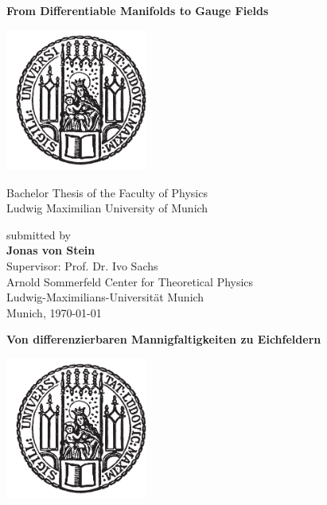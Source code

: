 \documentclass[a4paper,11pt,twoside,openright]{report}
\newcommand{\thesistitleEng}{From Differentiable Manifolds to Gauge Fields}
\newcommand{\thesistitleDe}{Von differenzierbaren Mannigfaltigkeiten zu Eichfeldern}
\newcommand{\authorname}{Jonas von Stein}
\newcommand{\thesisdate}{\today}
\begin{document}
\begin{titlepage}
  \begin{center}
    \vspace*{0.65cm}
    \huge
    \hspace*{-0.73cm}
    \textbf{\thesistitleEng}\\
    \vspace*{2.2cm}

    \includegraphics[width=0.35\textwidth]{figures/lmu_siege1.pdf}

    \vspace*{0.5cm}
    \Large
    Bachelor Thesis of the Faculty of Physics\\
    Ludwig Maximilian University of Munich

    \vspace*{3.5cm}
    \large
    submitted by\\[0.1cm]
    \Large \textbf{\authorname}\\

    \vfill
    \large
    Supervisor: Prof. Dr. Ivo Sachs\\[0.1cm]
    Arnold Sommerfeld Center for Theoretical Physics \\ Ludwig-Maximilians-Universität Munich\\
    \vspace*{1.5cm}
    Munich, \thesisdate
  \end{center}

\newpage

  \begin{center}
    \vspace*{0.65cm}
    \huge
    \hspace*{-0.73cm}
    \textbf{\thesistitleDe}\\
    \vspace*{2.2cm}

    \includegraphics[width=0.35\textwidth]{figures/lmu_siege1.pdf}


\end{center}
\end{titlepage}
\end{document}
